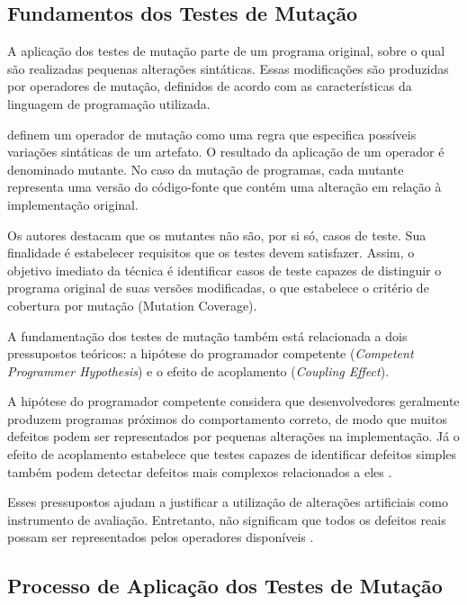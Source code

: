 \subsection{Fundamentos dos Testes de Mutação}

A aplicação dos testes de mutação parte de um programa original, sobre o qual são realizadas pequenas alterações sintáticas. Essas modificações são produzidas por operadores de mutação, definidos de acordo com as características da linguagem de programação utilizada.

 definem um operador de mutação como uma regra que especifica possíveis variações sintáticas de um artefato. O resultado da aplicação de um operador é denominado mutante. No caso da mutação de programas, cada mutante representa uma versão do código-fonte que contém uma alteração em relação à implementação original.

Os autores destacam que os mutantes não são, por si só, casos de teste. Sua finalidade é estabelecer requisitos que os testes devem satisfazer. Assim, o objetivo imediato da técnica é identificar casos de teste capazes de distinguir o programa original de suas versões modificadas, o que estabelece o critério de cobertura por mutação (Mutation Coverage).

A fundamentação dos testes de mutação também está relacionada a dois pressupostos teóricos: a hipótese do programador competente (\textit{Competent Programmer Hypothesis}) e o efeito de acoplamento (\textit{Coupling Effect}).

A hipótese do programador competente considera que desenvolvedores geralmente produzem programas próximos do comportamento correto, de modo que muitos defeitos podem ser representados por pequenas alterações na implementação. Já o efeito de acoplamento estabelece que testes capazes de identificar defeitos simples também podem detectar defeitos mais complexos relacionados a eles \cite{ammann2016}.

Esses pressupostos ajudam a justificar a utilização de alterações artificiais como instrumento de avaliação. Entretanto, não significam que todos os defeitos reais possam ser representados pelos operadores disponíveis \cite{just2014}.

\subsection{Processo de Aplicação dos Testes de Mutação}
\label{subsec:processo-aplicacao}

